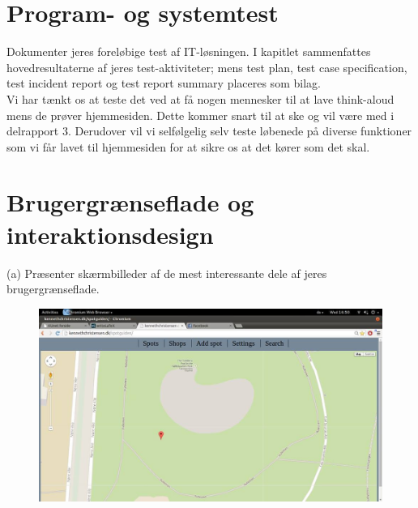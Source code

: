\documentclass[12pt]{article}
\begin{document}
\section{Program- og systemtest}
Dokumenter jeres foreløbige test af IT-løsningen. I kapitlet sammenfattes hovedresultaterne af
jeres test-aktiviteter; mens test plan, test case specification, test incident report og test report
summary placeres som bilag.\\
Vi har tænkt os at teste det ved at få nogen mennesker til at lave think-aloud mens de prøver hjemmesiden. Dette kommer snart til at ske og vil være med i delrapport 3. Derudover vil vi selfølgelig selv teste løbenede på diverse funktioner som vi får lavet til hjemmesiden for at sikre os at det kører som det skal.
\pagebreak
\section{Brugergrænseflade og interaktionsdesign}
(a) Præsenter skærmbilleder af de mest interessante dele af jeres brugergrænseflade.

\begin{figure}[h]
\includegraphics[scale = 0.3]{screen1}
\end{figure}
\end{document}
